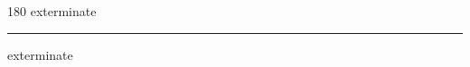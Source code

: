 
\begin{frame}
\begin{center}
\begin{turn}{180}
{\fontsize{2.5cm}{1em}\selectfont exterminate}
\end{turn}
\vspace{1em}\par  
\hrule
\vspace{1em}\par  
{\fontsize{2.5cm}{1em}\selectfont exterminate}
\end{center}
\end{frame}
